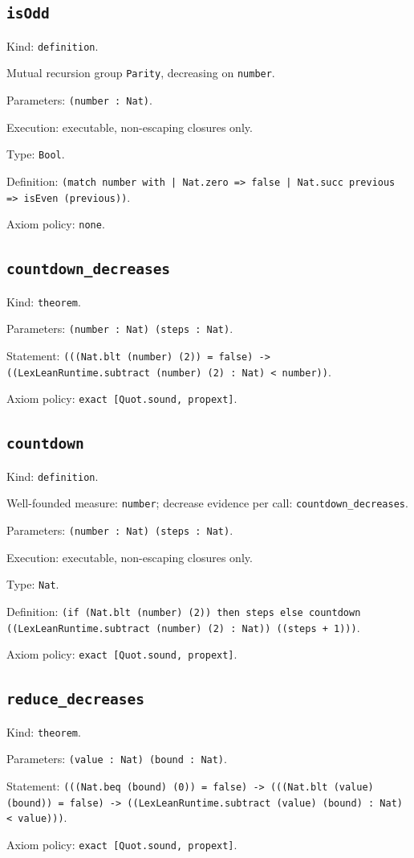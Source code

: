 \documentclass[11pt]{article}
\begin{document}
\subsection*{\texttt{isOdd}}
\noindent Kind: \texttt{definition}.\par
\noindent Mutual recursion group \texttt{Parity}, decreasing on \texttt{number}.\par
\noindent Parameters: \texttt{(number : Nat)}.\par
\noindent Execution: executable, non-escaping closures only.\par
\noindent Type: \texttt{Bool}.\par
\noindent Definition: \texttt{(match number with | Nat.zero => false | Nat.succ previous => isEven (previous))}.\par
\noindent Axiom policy: \texttt{none}.\par
\subsection*{\texttt{countdown\_decreases}}
\noindent Kind: \texttt{theorem}.\par
\noindent Parameters: \texttt{(number : Nat) (steps : Nat)}.\par
\noindent Statement: \texttt{(((Nat.blt (number) (2)) = false) -> ((LexLeanRuntime.subtract (number) (2) : Nat) < number))}.\par
\noindent Axiom policy: \texttt{exact [Quot.sound, propext]}.\par
\subsection*{\texttt{countdown}}
\noindent Kind: \texttt{definition}.\par
\noindent Well-founded measure: \texttt{number}; decrease evidence per call: \texttt{countdown\_decreases}.\par
\noindent Parameters: \texttt{(number : Nat) (steps : Nat)}.\par
\noindent Execution: executable, non-escaping closures only.\par
\noindent Type: \texttt{Nat}.\par
\noindent Definition: \texttt{(if (Nat.blt (number) (2)) then steps else countdown ((LexLeanRuntime.subtract (number) (2) : Nat)) ((steps + 1)))}.\par
\noindent Axiom policy: \texttt{exact [Quot.sound, propext]}.\par
\subsection*{\texttt{reduce\_decreases}}
\noindent Kind: \texttt{theorem}.\par
\noindent Parameters: \texttt{(value : Nat) (bound : Nat)}.\par
\noindent Statement: \texttt{(((Nat.beq (bound) (0)) = false) -> (((Nat.blt (value) (bound)) = false) -> ((LexLeanRuntime.subtract (value) (bound) : Nat) < value)))}.\par
\noindent Axiom policy: \texttt{exact [Quot.sound, propext]}.\par
\end{document}
